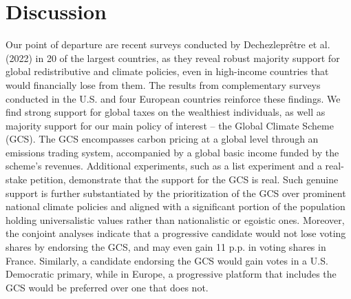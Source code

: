 \documentclass{nature}
\makeatletter
\renewenvironment*{figure}{\@float{figure}}{\end@float}
\makeatother
\begin{document}


\section{Discussion} %
Our point of departure are recent surveys %
 conducted by Dechezleprêtre et al. (2022) 
in 20 of the largest countries, %
as they reveal robust majority support for global redistributive and climate policies, even in high-income countries that would financially lose from them.\cite{dechezlepretre_fighting_2022} The results from %
complementary surveys conducted in the U.S. and four European countries %
reinforce these findings. We find strong support for global taxes on the wealthiest individuals, as well as majority support for our main policy of interest -- the Global Climate Scheme (GCS). The GCS encompasses carbon pricing at a global level through an emissions trading system, accompanied by a global basic income funded by the scheme's revenues. Additional experiments, such as a list experiment and a real-stake petition, demonstrate that the support for the GCS is real. 
Such genuine support is further substantiated by the prioritization of the GCS over prominent national climate policies and aligned with a significant portion of the population holding universalistic values rather than nationalistic or egoistic ones. Moreover, the conjoint analyses indicate that a progressive candidate would not lose voting shares by endorsing the GCS, and may even gain 11 p.p. in voting shares in France. Similarly, a candidate endorsing the GCS would gain votes in a U.S. Democratic primary, while in Europe, a progressive platform that includes the GCS would be preferred over one that does not.

\end{document}
